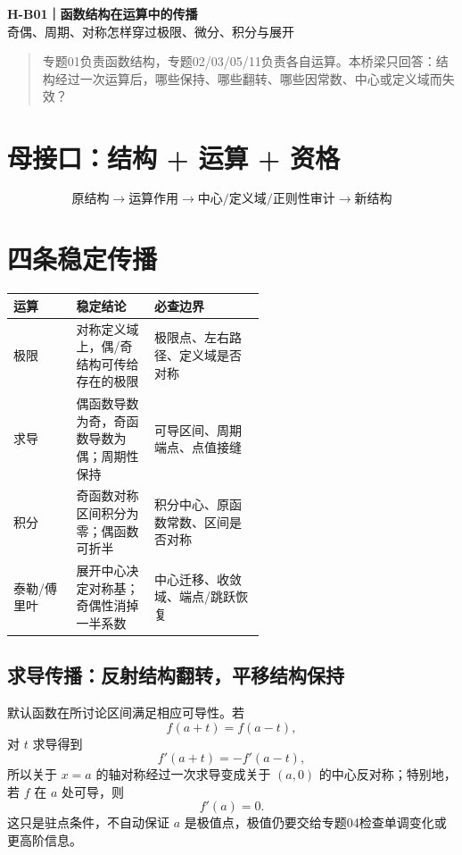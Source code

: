 \documentclass[11pt,a4paper]{ctexart}
\begin{document}
\begin{center}
{\LARGE\textbf{H-B01｜函数结构在运算中的传播}}\\[0.4em]
{\large 奇偶、周期、对称怎样穿过极限、微分、积分与展开}
\end{center}
\begin{quote}
专题01负责函数结构，专题02/03/05/11负责各自运算。本桥梁只回答：结构经过一次运算后，哪些保持、哪些翻转、哪些因常数、中心或定义域而失效？
\end{quote}
\section{母接口：结构 + 运算 + 资格}
\[
\boxed{\text{原结构}\to\text{运算作用}\to\text{中心/定义域/正则性审计}\to\text{新结构}}
\]
\begin{center}
\end{center}
\section{四条稳定传播}
\begin{tabularx}{\linewidth}{L{0.25\linewidth}L{0.31\linewidth}X}
\toprule
运算 & 稳定结论 & 必查边界\\
\midrule
极限 & 对称定义域上，偶/奇结构可传给存在的极限 & 极限点、左右路径、定义域是否对称\\
求导 & 偶函数导数为奇，奇函数导数为偶；周期性保持 & 可导区间、周期端点、点值接缝\\
积分 & 奇函数对称区间积分为零；偶函数可折半 & 积分中心、原函数常数、区间是否对称\\
泰勒/傅里叶 & 展开中心决定对称基；奇偶性消掉一半系数 & 中心迁移、收敛域、端点/跳跃恢复\\
\bottomrule
\end{tabularx}
\subsection{求导传播：反射结构翻转，平移结构保持}
默认函数在所讨论区间满足相应可导性。若
\[
f(a+t)=f(a-t),
\]
对 $t$ 求导得到
\[
\boxed{f'(a+t)=-f'(a-t)},
\]
所以关于 $x=a$ 的轴对称经过一次求导变成关于 $(a,0)$ 的中心反对称；特别地，若 $f$ 在 $a$ 处可导，则
\[
\boxed{f'(a)=0}.
\]
这只是驻点条件，不自动保证 $a$ 是极值点，极值仍要交给专题04检查单调变化或更高阶信息。
\end{document}
